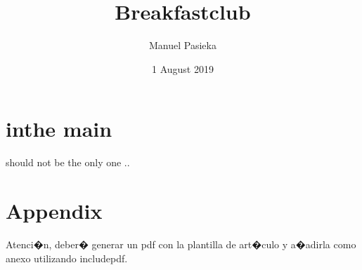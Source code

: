 \documentclass[11pt, a4paper, english]{book}
\title{Breakfastclub}
\author{Manuel Pasieka}
\date{1 August 2019}
\begin{document}
\renewcommand{\listfigurename}{Figures}
\renewcommand{\listtablename}{Tables}
\renewcommand{\contentsname}{Additional Content}
\renewcommand{\figurename}{Figura}
\renewcommand{\tablename}{Tabla} 

\maketitle

\frontmatter

\tableofcontents
\listoffigures
\listoftables



\mainmatter













\chapter{inthe main}
should not be the only one ..

 


\appendix
\chapter{Appendix}
Atenci�n, deber� generar un pdf con la plantilla de art�culo y a�adirla como anexo utilizando includepdf.






\end{document}
